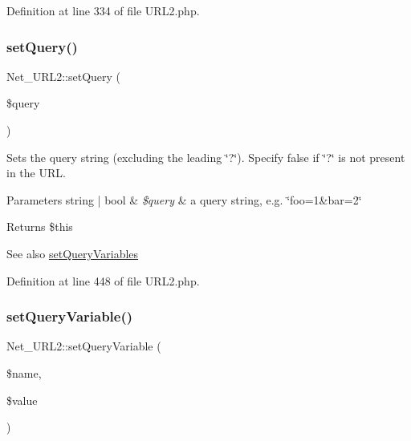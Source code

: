 Definition at line 334 of file U\+R\+L2.\+php.

\hypertarget{classNet__URL2_a8ef0c4583fcbc47e980f5facadc96295}{}\label{classNet__URL2_a8ef0c4583fcbc47e980f5facadc96295} 
\subsubsection{\texorpdfstring{set\+Query()}{setQuery()}}
{\footnotesize\ttfamily Net\+\_\+\+U\+R\+L2\+::set\+Query (\begin{DoxyParamCaption}\item[{}]{\$query }\end{DoxyParamCaption})}

Sets the query string (excluding the leading \char`\"{}?\char`\"{}). Specify false if \char`\"{}?\char`\"{} is not present in the U\+RL.


\begin{DoxyParams}[1]{Parameters}
string | bool & {\em \$query} & a query string, e.\+g. \char`\"{}foo=1\&bar=2\char`\"{}\\
\hline
\end{DoxyParams}
\begin{DoxyReturn}{Returns}
\$this 
\end{DoxyReturn}
\begin{DoxySeeAlso}{See also}
\hyperlink{classNet__URL2_a2b93dbf912e578998c7447788400cc07}{set\+Query\+Variables} 
\end{DoxySeeAlso}


Definition at line 448 of file U\+R\+L2.\+php.

\hypertarget{classNet__URL2_a30d2d35e20ee1391db08c5ab74ffb262}{}\label{classNet__URL2_a30d2d35e20ee1391db08c5ab74ffb262} 
\subsubsection{\texorpdfstring{set\+Query\+Variable()}{setQueryVariable()}}
{\footnotesize\ttfamily Net\+\_\+\+U\+R\+L2\+::set\+Query\+Variable (\begin{DoxyParamCaption}\item[{}]{\$name,  }\item[{}]{\$value }\end{DoxyParamCaption})}

